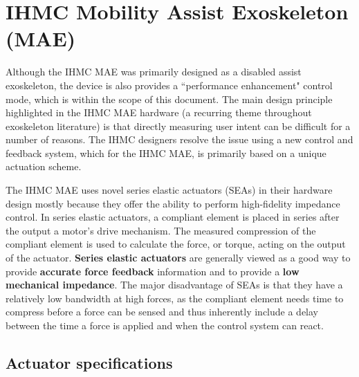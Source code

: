 



% 
\section{IHMC Mobility Assist Exoskeleton (MAE)}
Although the IHMC MAE was primarily designed as a disabled assist exoskeleton, the device is also provides a ``performance enhancement" control mode, which is within the scope of this document.  The main design principle highlighted in the IHMC MAE hardware (a recurring theme throughout exoskeleton literature) is that directly measuring user intent can be difficult for a number of reasons.  The IHMC designers resolve the issue using a new control and feedback system, which for the IHMC MAE, is primarily based on a unique actuation scheme. 

The IHMC MAE uses novel series elastic actuators (SEAs) in their hardware design mostly because they offer the ability to perform high-fidelity impedance control.  In series elastic actuators, a compliant element is placed in series after the output a motor's drive mechanism. The measured compression of the compliant element is used to calculate the force, or torque, acting on the output of the actuator.  { \bf Series elastic actuators} are generally viewed as a good way to provide {\bf accurate force feedback} information and to provide a {\bf low mechanical impedance}.  The major disadvantage of SEAs is that they have a relatively low bandwidth at high forces, as the compliant element needs time to compress before a force can be sensed and thus inherently include a delay between the time a force is applied and when the control system can react.

\subsection{Actuator specifications}


